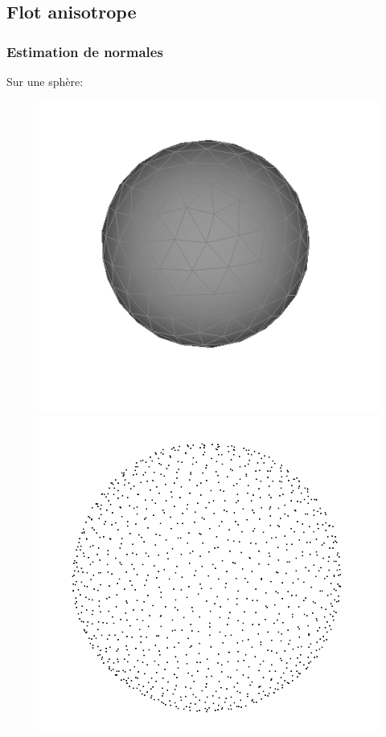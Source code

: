 \documentclass{beamer}
\begin{document}
\subsection{Flot anisotrope}
\begin{frame}
    \frametitle{Estimation de normales}

    Sur une sphère:
    \begin{figure}
        \centering
        \includegraphics[scale=0.22]{img/sphere-polyhedron-200}
        \includegraphics[scale=0.2]{img/sphere-1000}

\end{figure}
\end{frame}
\end{document}
